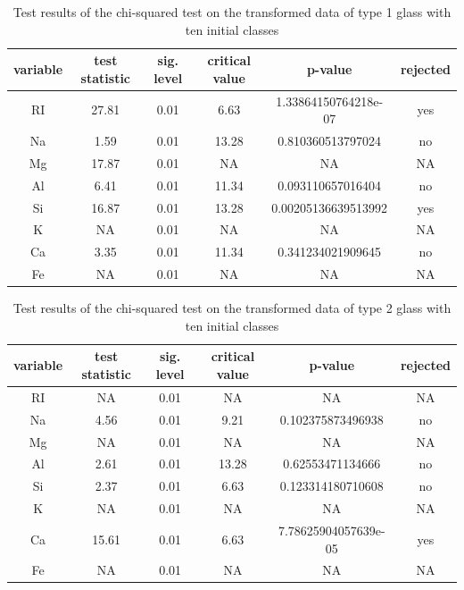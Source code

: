 \documentclass[a4paper, 12pt, titlepage, headsepline, listof = totoc, bibliography = totoc, numbers = noenddot]{scrartcl}
\begin{document}
\begin{appendix}
\begin{table}[h!]
\centering
\begin{tabular}{|cccccc|} \hline variable & test statistic & sig. level & critical value & p-value & rejected\\ \hline RI & 27.81 & 0.01 & 6.63 & 1.33864150764218e-07 & yes\\ 
Na & 1.59 & 0.01 & 13.28 & 0.810360513797024 & no\\ 
Mg & 17.87 & 0.01 & NA & NA & NA\\ 
Al & 6.41 & 0.01 & 11.34 & 0.093110657016404 & no\\ 
Si & 16.87 & 0.01 & 13.28 & 0.00205136639513992 & yes\\ 
K & NA & 0.01 & NA & NA & NA\\ 
Ca & 3.35 & 0.01 & 11.34 & 0.341234021909645 & no\\ 
Fe & NA & 0.01 & NA & NA & NA\\ \hline \end{tabular}\caption{Test results of the chi-squared test on the transformed data of type 1 glass with ten initial classes}
\label{tab:chi-type1-trans}
\end{table}

\begin{table}[h!]
\centering
\begin{tabular}{|cccccc|} \hline variable & test statistic & sig. level & critical value & p-value & rejected\\ \hline RI & NA & 0.01 & NA & NA & NA\\ 
Na & 4.56 & 0.01 & 9.21 & 0.102375873496938 & no\\ 
Mg & NA & 0.01 & NA & NA & NA\\ 
Al & 2.61 & 0.01 & 13.28 & 0.62553471134666 & no\\ 
Si & 2.37 & 0.01 & 6.63 & 0.123314180710608 & no\\ 
K & NA & 0.01 & NA & NA & NA\\ 
Ca & 15.61 & 0.01 & 6.63 & 7.78625904057639e-05 & yes\\ 
Fe & NA & 0.01 & NA & NA & NA\\ \hline \end{tabular}\caption{Test results of the chi-squared test on the transformed data of type 2 glass with ten initial classes}
\label{tab:chi-type2-trans}
\end{table}


\end{appendix}
\end{document}
